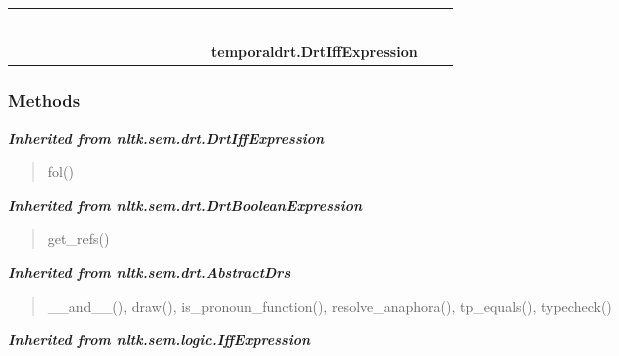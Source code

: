 \begin{tabular}{cccccccccccccccccc}
&&\multicolumn{1}{|c}{}
  \\\cline{11-11}
  &&&&&&&&&&\multicolumn{1}{c|}{}
&&
&\multicolumn{1}{|c}{}&
&\multicolumn{1}{|c}{}&
  \\
\multicolumn{12}{r}{\settowidth{\BCL}{nltk.sem.logic.IffExpression}\multirow{2}{\BCL}{nltk.sem.logic.IffExpression}}
&&\multicolumn{1}{|c}{}
&&\multicolumn{1}{|c}{}
  \\\cline{13-13}
  &&&&&&&&&&&&\multicolumn{1}{c|}{}
&\multicolumn{1}{|c}{}&
&\multicolumn{1}{|c}{}&
  \\
\multicolumn{14}{r}{\settowidth{\BCL}{nltk.sem.drt.DrtIffExpression}\multirow{2}{\BCL}{nltk.sem.drt.DrtIffExpression}}
&&\multicolumn{1}{|c}{}
  \\\cline{15-15}
  &&&&&&&&&&&&&&\multicolumn{1}{c|}{}
&\multicolumn{1}{|c}{}&
  \\
&&&&&&&&&&&&&&\multicolumn{2}{l}{\textbf{temporaldrt.DrtIffExpression}}
\end{tabular}



  \subsubsection{Methods}


\large{\textbf{\textit{Inherited from nltk.sem.drt.DrtIffExpression}}}

\begin{quote}
fol()
\end{quote}

\large{\textbf{\textit{Inherited from nltk.sem.drt.DrtBooleanExpression}}}

\begin{quote}
get\_refs()
\end{quote}

\large{\textbf{\textit{Inherited from nltk.sem.drt.AbstractDrs}}}

\begin{quote}
\_\_and\_\_(), draw(), is\_pronoun\_function(), resolve\_anaphora(), tp\_equals(), typecheck()
\end{quote}

\large{\textbf{\textit{Inherited from nltk.sem.logic.IffExpression}}}

